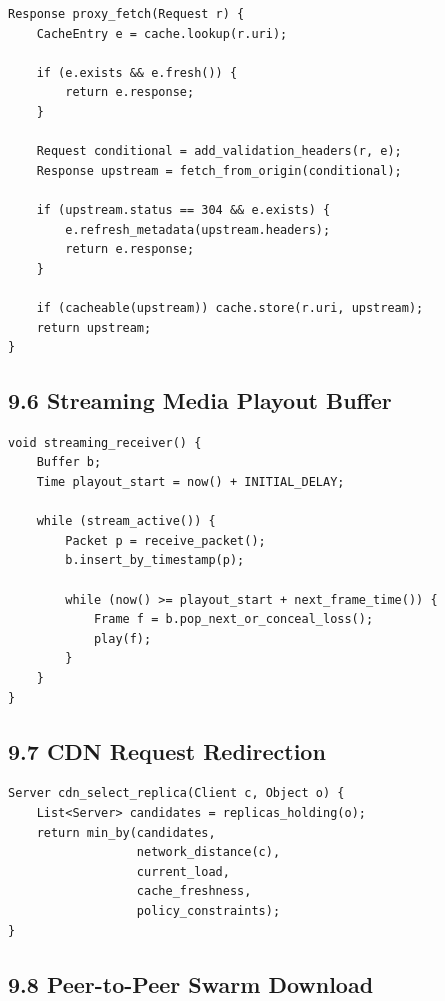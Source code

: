 \documentclass[11pt]{article}
\begin{document}
\begin{verbatim}
Response proxy_fetch(Request r) {
    CacheEntry e = cache.lookup(r.uri);

    if (e.exists && e.fresh()) {
        return e.response;
    }

    Request conditional = add_validation_headers(r, e);
    Response upstream = fetch_from_origin(conditional);

    if (upstream.status == 304 && e.exists) {
        e.refresh_metadata(upstream.headers);
        return e.response;
    }

    if (cacheable(upstream)) cache.store(r.uri, upstream);
    return upstream;
}
\end{verbatim}

\subsection{9.6 Streaming Media Playout
Buffer}\label{streaming-media-playout-buffer}

\begin{verbatim}
void streaming_receiver() {
    Buffer b;
    Time playout_start = now() + INITIAL_DELAY;

    while (stream_active()) {
        Packet p = receive_packet();
        b.insert_by_timestamp(p);

        while (now() >= playout_start + next_frame_time()) {
            Frame f = b.pop_next_or_conceal_loss();
            play(f);
        }
    }
}
\end{verbatim}

\subsection{9.7 CDN Request Redirection}\label{cdn-request-redirection}

\begin{verbatim}
Server cdn_select_replica(Client c, Object o) {
    List<Server> candidates = replicas_holding(o);
    return min_by(candidates,
                  network_distance(c),
                  current_load,
                  cache_freshness,
                  policy_constraints);
}
\end{verbatim}

\subsection{9.8 Peer-to-Peer Swarm
Download}\label{peer-to-peer-swarm-download}
\end{document}
